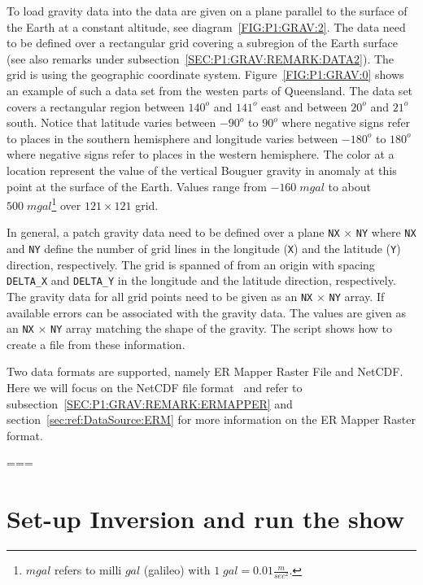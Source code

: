 To load gravity data into  \downunder the data are given on a plane parallel to the surface of the Earth at a constant
altitude, see diagram~\ref{FIG:P1:GRAV:2}. The data need to be defined over a rectangular grid covering a subregion of 
the Earth surface (see also remarks under subsection~\ref{SEC:P1:GRAV:REMARK:DATA2}). 
The grid is using the geographic coordinate system. Figure~\ref{FIG:P1:GRAV:0} shows an example of such a data set
from the westen parts of Queensland. The data set covers a rectangular region between $140^o$ and $141^o$ east 
and between $20^o$ and $21^o$ south. Notice that latitude varies between $-90^o$ to $90^o$ where
negative signs refer to places in the southern hemisphere and
longitude varies between $-180^o$ to $180^o$ where
negative signs refer to places in the western hemisphere.
The color at a location represent the value of the vertical Bouguer gravity in  anomaly at this point at the surface of the Earth.
Values range from $-160  \;  mgal$ to about $500 \; mgal$\footnote{$mgal$ refers to milli $gal$ (galileo) with 
$1 \;  gal = 0.01 \frac{m}{sec^2}$.} over $121 \times 121$ grid.

In general, a patch gravity data need to be defined over a plane \verb|NX| $\times$ \verb|NY| where 
\verb|NX|  and \verb|NY|  define the number of grid lines in the longitude (\verb|X|) and the latitude (\verb|Y|) 
direction, respectively. The grid is spanned of from an origin with spacing
\verb|DELTA_X| and \verb|DELTA_Y| in the longitude and the latitude direction, respectively. 
The gravity data for all grid points need to be given as an \verb|NX| $\times$ \verb|NY| array.  
If available errors can be associated with the gravity data. The values are given as an \verb|NX| $\times$ \verb|NY| array
matching the shape of the gravity. 
The script  shows how to create a \netcdf file from these information.


Two data formats are supported, namely ER Mapper Raster File and NetCDF. Here we will
focus on the NetCDF file format~\cite{NETCDF} and refer to subsection~\ref{SEC:P1:GRAV:REMARK:ERMAPPER} and
section~\ref{sec:ref:DataSource:ERM} for more information on the ER Mapper Raster format.

===




\section{Set-up Inversion and run the show}

